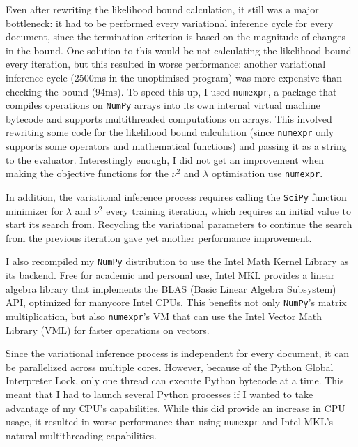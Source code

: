 \documentclass[12pt,a4paper,twoside,openright]{report}
\begin{document}
Even after rewriting the likelihood bound calculation, it still was a major bottleneck: it had to be performed every variational inference cycle for every document, since the termination criterion is based on the magnitude of changes in the bound. One solution to this would be not calculating the likelihood bound every iteration, but this resulted in worse performance: another variational inference cycle (2500ms in the unoptimised program) was more expensive than checking the bound (94ms). To speed this up, I used \texttt{numexpr}, a package that compiles operations on \texttt{NumPy} arrays into its own internal virtual machine bytecode and supports multithreaded computations on arrays. This involved rewriting some code for the likelihood bound calculation (since \texttt{numexpr} only supports some operators and mathematical functions) and passing it as a string to the evaluator. Interestingly enough, I did not get an improvement when making the objective functions for the $\nu^2$ and $\lambda$ optimisation use \texttt{numexpr}.

In addition, the variational inference process requires calling the \texttt{SciPy} function minimizer for $\lambda$ and $\nu^2$ every training iteration, which requires an initial value to start its search from. Recycling the variational parameters to continue the search from the previous iteration gave yet another performance improvement.

I also recompiled my \texttt{NumPy} distribution to use the Intel Math Kernel Library as its backend. Free for academic and personal use, Intel MKL provides a linear algebra library that implements the BLAS (Basic Linear Algebra Subsystem) API, optimized for manycore Intel CPUs. This benefits not only \texttt{NumPy}'s matrix multiplication, but also \texttt{numexpr}'s VM that can use the Intel Vector Math Library (VML) for faster operations on vectors.

Since the variational inference process is independent for every document, it can be parallelized across multiple cores. However, because of the Python Global Interpreter Lock, only one thread can execute Python bytecode at a time. This meant that I had to launch several Python processes if I wanted to take advantage of my CPU's capabilities. While this did provide an increase in CPU usage, it resulted in worse performance than using \texttt{numexpr} and Intel MKL's natural multithreading capabilities.
\end{document}
